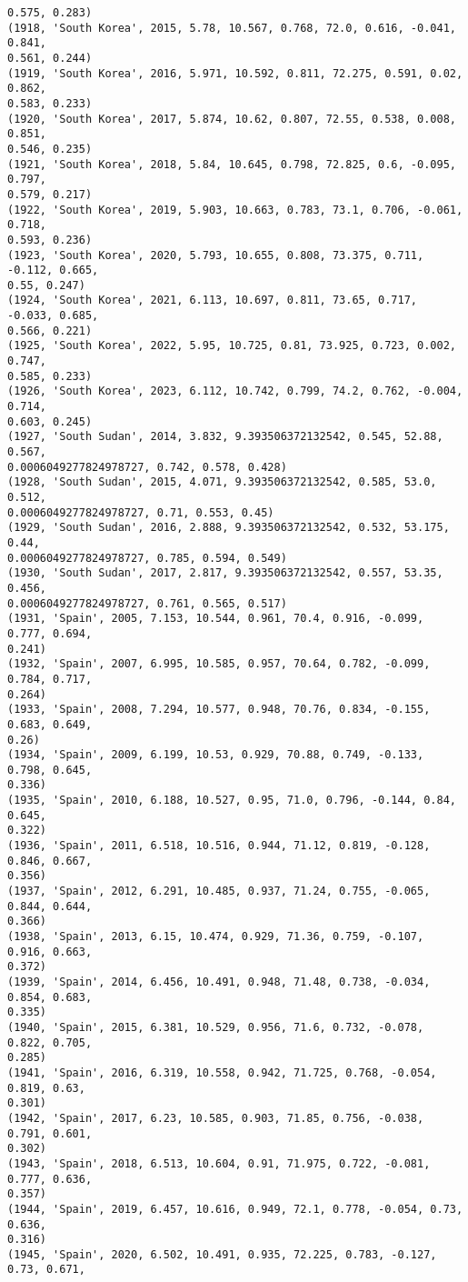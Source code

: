 \documentclass[11pt]{article}
\begin{document}
\begin{Verbatim}[commandchars=\\\{\}]
0.575, 0.283)
(1918, 'South Korea', 2015, 5.78, 10.567, 0.768, 72.0, 0.616, -0.041, 0.841,
0.561, 0.244)
(1919, 'South Korea', 2016, 5.971, 10.592, 0.811, 72.275, 0.591, 0.02, 0.862,
0.583, 0.233)
(1920, 'South Korea', 2017, 5.874, 10.62, 0.807, 72.55, 0.538, 0.008, 0.851,
0.546, 0.235)
(1921, 'South Korea', 2018, 5.84, 10.645, 0.798, 72.825, 0.6, -0.095, 0.797,
0.579, 0.217)
(1922, 'South Korea', 2019, 5.903, 10.663, 0.783, 73.1, 0.706, -0.061, 0.718,
0.593, 0.236)
(1923, 'South Korea', 2020, 5.793, 10.655, 0.808, 73.375, 0.711, -0.112, 0.665,
0.55, 0.247)
(1924, 'South Korea', 2021, 6.113, 10.697, 0.811, 73.65, 0.717, -0.033, 0.685,
0.566, 0.221)
(1925, 'South Korea', 2022, 5.95, 10.725, 0.81, 73.925, 0.723, 0.002, 0.747,
0.585, 0.233)
(1926, 'South Korea', 2023, 6.112, 10.742, 0.799, 74.2, 0.762, -0.004, 0.714,
0.603, 0.245)
(1927, 'South Sudan', 2014, 3.832, 9.393506372132542, 0.545, 52.88, 0.567,
0.0006049277824978727, 0.742, 0.578, 0.428)
(1928, 'South Sudan', 2015, 4.071, 9.393506372132542, 0.585, 53.0, 0.512,
0.0006049277824978727, 0.71, 0.553, 0.45)
(1929, 'South Sudan', 2016, 2.888, 9.393506372132542, 0.532, 53.175, 0.44,
0.0006049277824978727, 0.785, 0.594, 0.549)
(1930, 'South Sudan', 2017, 2.817, 9.393506372132542, 0.557, 53.35, 0.456,
0.0006049277824978727, 0.761, 0.565, 0.517)
(1931, 'Spain', 2005, 7.153, 10.544, 0.961, 70.4, 0.916, -0.099, 0.777, 0.694,
0.241)
(1932, 'Spain', 2007, 6.995, 10.585, 0.957, 70.64, 0.782, -0.099, 0.784, 0.717,
0.264)
(1933, 'Spain', 2008, 7.294, 10.577, 0.948, 70.76, 0.834, -0.155, 0.683, 0.649,
0.26)
(1934, 'Spain', 2009, 6.199, 10.53, 0.929, 70.88, 0.749, -0.133, 0.798, 0.645,
0.336)
(1935, 'Spain', 2010, 6.188, 10.527, 0.95, 71.0, 0.796, -0.144, 0.84, 0.645,
0.322)
(1936, 'Spain', 2011, 6.518, 10.516, 0.944, 71.12, 0.819, -0.128, 0.846, 0.667,
0.356)
(1937, 'Spain', 2012, 6.291, 10.485, 0.937, 71.24, 0.755, -0.065, 0.844, 0.644,
0.366)
(1938, 'Spain', 2013, 6.15, 10.474, 0.929, 71.36, 0.759, -0.107, 0.916, 0.663,
0.372)
(1939, 'Spain', 2014, 6.456, 10.491, 0.948, 71.48, 0.738, -0.034, 0.854, 0.683,
0.335)
(1940, 'Spain', 2015, 6.381, 10.529, 0.956, 71.6, 0.732, -0.078, 0.822, 0.705,
0.285)
(1941, 'Spain', 2016, 6.319, 10.558, 0.942, 71.725, 0.768, -0.054, 0.819, 0.63,
0.301)
(1942, 'Spain', 2017, 6.23, 10.585, 0.903, 71.85, 0.756, -0.038, 0.791, 0.601,
0.302)
(1943, 'Spain', 2018, 6.513, 10.604, 0.91, 71.975, 0.722, -0.081, 0.777, 0.636,
0.357)
(1944, 'Spain', 2019, 6.457, 10.616, 0.949, 72.1, 0.778, -0.054, 0.73, 0.636,
0.316)
(1945, 'Spain', 2020, 6.502, 10.491, 0.935, 72.225, 0.783, -0.127, 0.73, 0.671,

\end{Verbatim}
\end{document}
